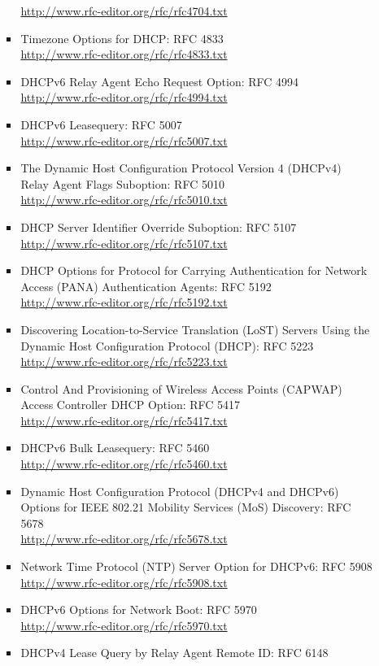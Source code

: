 \begin{itemize}
\begin{itemize}
\begin{itemize}
\url{http://www.rfc-editor.org/rfc/rfc4704.txt}
\item Timezone Options for DHCP: RFC 4833\\
\url{http://www.rfc-editor.org/rfc/rfc4833.txt}
\item DHCPv6 Relay Agent Echo Request Option: RFC 4994\\
\url{http://www.rfc-editor.org/rfc/rfc4994.txt}
\item DHCPv6 Leasequery: RFC 5007\\
\url{http://www.rfc-editor.org/rfc/rfc5007.txt}
\item The Dynamic Host Configuration Protocol Version 4 (DHCPv4) 
Relay Agent Flags Suboption: RFC 5010\\
\url{http://www.rfc-editor.org/rfc/rfc5010.txt}
\item DHCP Server Identifier Override Suboption: RFC 5107\\
\url{http://www.rfc-editor.org/rfc/rfc5107.txt}
\item DHCP Options for Protocol for Carrying Authentication for 
Network Access (PANA) Authentication Agents: RFC 5192\\
\url{http://www.rfc-editor.org/rfc/rfc5192.txt}
\item Discovering Location-to-Service Translation (LoST) Servers 
Using the Dynamic Host Configuration Protocol (DHCP): RFC 5223\\
\url{http://www.rfc-editor.org/rfc/rfc5223.txt}
\item Control And Provisioning of Wireless Access Points (CAPWAP) 
Access Controller DHCP Option: RFC 5417\\
\url{http://www.rfc-editor.org/rfc/rfc5417.txt}
\item DHCPv6 Bulk Leasequery: RFC 5460\\
\url{http://www.rfc-editor.org/rfc/rfc5460.txt}
\item Dynamic Host Configuration Protocol (DHCPv4 and DHCPv6) Options for IEEE 802.21 Mobility Services (MoS) Discovery: RFC 5678\\
\url{http://www.rfc-editor.org/rfc/rfc5678.txt}
\item Network Time Protocol (NTP) Server Option for DHCPv6: RFC 5908\\
\url{http://www.rfc-editor.org/rfc/rfc5908.txt}
\item DHCPv6 Options for Network Boot: RFC 5970\\
\url{http://www.rfc-editor.org/rfc/rfc5970.txt}
\item DHCPv4 Lease Query by Relay Agent Remote ID: RFC 6148\\

\end{itemize}
\end{itemize}
\end{itemize}
